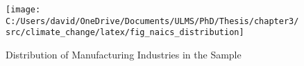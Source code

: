 \begin{figure}[H]
    \centering
    \texttt{[image: C:/Users/david/OneDrive/Documents/ULMS/PhD/Thesis/chapter3/src/climate\_change/latex/fig\_naics\_distribution]}
    \caption{Distribution of Manufacturing Industries in the Sample}
    \label{fig:naics-manufacturing-industries}
\end{figure}